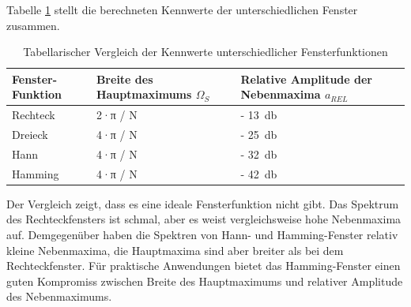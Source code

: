 Tabelle \ref{tab:10.6} stellt die berechneten Kennwerte der unterschiedlichen Fenster zusammen.

\begin{table}
  \centering
  \caption{Tabellarischer Vergleich der Kennwerte unterschiedlicher Fensterfunktionen}
  \label{tab:10.6}
  \begin{tabular}{lll}
    \toprule
    Fenster- 
Funktion
 & 
Breite des 
Hauptmaximums \(Ω_{S}\)
 & 
Relative Amplitude 
der Nebenmaxima \(a_{REL}\) \\
    \midrule
    Rechteck & 2·π / N & - \qty{13}{\decibel} \\
    Dreieck & 4·π / N & - \qty{25}{\decibel} \\
    Hann & 4·π / N & - \qty{32}{\decibel} \\
    Hamming & 4·π / N & - \qty{42}{\decibel} \\
    \bottomrule
  \end{tabular}
\end{table}

Der Vergleich zeigt, dass es eine ideale Fensterfunktion nicht gibt. Das Spektrum des Rechteckfensters ist schmal, aber es weist vergleichsweise hohe Nebenmaxima auf. Demgegenüber haben die Spektren von Hann- und Hamming-Fenster relativ kleine Nebenmaxima, die Hauptmaxima sind aber breiter als bei dem Rechteckfenster. Für praktische Anwendungen bietet das Hamming-Fenster einen guten Kompromiss zwischen Breite des Hauptmaximums und relativer Amplitude des Nebenmaximums.

